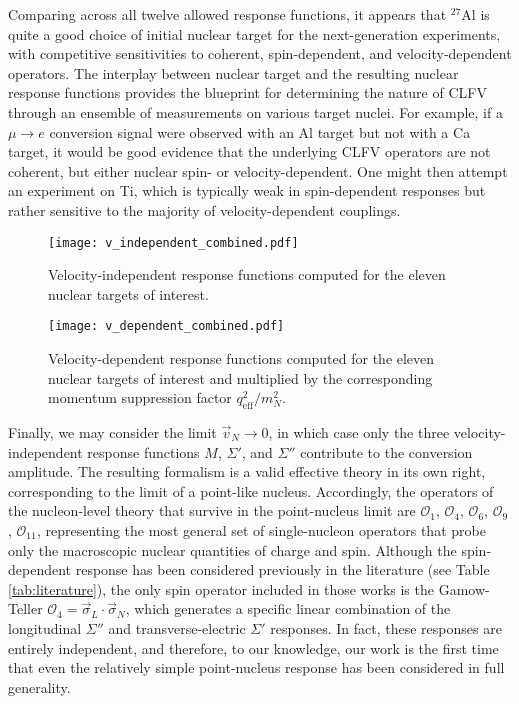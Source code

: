 \documentclass[12pt,letterpaper]{book}
\begin{document}
Comparing across all twelve allowed response functions, it appears that $^{27}$Al is quite a good choice of initial nuclear target for the next-generation experiments, with competitive sensitivities to coherent, spin-dependent, and velocity-dependent operators. The interplay between nuclear target and the resulting nuclear response functions provides the blueprint for determining the nature of CLFV through an ensemble of measurements on various target nuclei. For example, if a $\mu\rightarrow e$ conversion signal were observed with an Al target but not with a Ca target, it would be good evidence that the underlying CLFV operators are not coherent, but either nuclear spin- or velocity-dependent. One might then attempt an experiment on Ti, which is typically weak in spin-dependent responses but rather sensitive to the majority of velocity-dependent couplings.
\begin{figure}
\centering
\texttt{[image: v\_independent\_combined.pdf]}
\caption{Velocity-independent response functions computed for the eleven nuclear targets of interest.}
\label{fig:v_ind_responses}
\end{figure}
\begin{figure}
\centering
\texttt{[image: v\_dependent\_combined.pdf]}
\caption{Velocity-dependent response functions computed for the eleven nuclear targets of interest and multiplied by the corresponding momentum suppression factor $q_\mathrm{eff}^2/m_N^2$.}
\label{fig:v_dep_responses}
\end{figure}

Finally, we may consider the limit $\vec{v}_N\rightarrow 0$, in which case only the three velocity-independent response functions $M$, $\Sigma'$, and $\Sigma''$ contribute to the conversion amplitude. The resulting formalism is a valid effective theory in its own right, corresponding to the limit of a point-like nucleus. Accordingly, the operators of the nucleon-level theory that survive in the point-nucleus limit are $\mathcal{O}_1$, $\mathcal{O}_4$, $\mathcal{O}_6$, $\mathcal{O}_9$, $\mathcal{O}_{11}$, representing the most general set of single-nucleon operators that probe only the macroscopic nuclear quantities of charge and spin. Although the spin-dependent response has been considered previously in the literature (see Table \ref{tab:literature}), the only spin operator included in those works is the Gamow-Teller $\mathcal{O}_4=\vec{\sigma}_L\cdot\vec{\sigma}_N$, which generates a specific linear combination of the longitudinal $\Sigma''$ and transverse-electric $\Sigma'$ responses. In fact, these responses are entirely independent, and therefore, to our knowledge, our work is the first time that even the relatively simple point-nucleus response has been considered in full generality.
\end{document}
